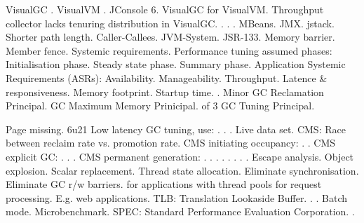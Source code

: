 \I VisualGC .
\I VisualVM .
\I JConsole  \tw{<} 6.
\I VisualGC for VisualVM.
\I Throughput collector lacks tenuring distribution in VisualGC.
\I {}.
\I {}.
\I {}.
\I MBeans.
\I JMX.
\I jstack.
\I Shorter path length.
\I Caller-Callees.
\I JVM-System.
\I JSR-133.
\I Memory barrier.
\I Member fence.
\I Systemic requirements.
\I Performance tuning assumed phases:
\II Initialisation phase.
\II Steady state phase.
\II Summary phase.
\I Application Systemic Requirements (ASRs):
\II Availability.
\II Manageability.
\II Throughput.
\II Latence \& responsiveness.
\II Memory footprint.
\II Startup time.
\I {}.
\I Minor GC Reclamation Principal.
\I GC Maximum Memory Prinicipal.
 of 3 GC Tuning Principal.

\pskip
Page missing.
\I {} 6u21
\lskip
\I Low latency GC tuning, use:
\II {}.
\II {}.
\II {}.
\II Live data set.
\II CMS: Race between reclaim rate vs. promotion rate.
\I CMS initiating occupancy:
\II {}.
\II {}.
\I CMS explicit GC:
\II {}.
\II {}.
\II {}.
\I CMS permanent generation:
\II {}.
\II {}.
\I {}.
\I {}.
\I {}.
\I {}.
\I {}.
\I {}.
\I Escape analysis.
\I Object explosion.
\I Scalar replacement.
\I Thread state allocation.
\I Eliminate synchronisation.
\I Eliminate GC r/w barriers.
\I {} for applications with thread pools for request processing. E.g. web applications.
\I TLB: Translation Lookaside Buffer.
\I {}.
\I {}.
\I Batch mode.
\I Microbenchmark.
\I SPEC: Standard Performance Evaluation Corporation.
\I {}.
\bye

